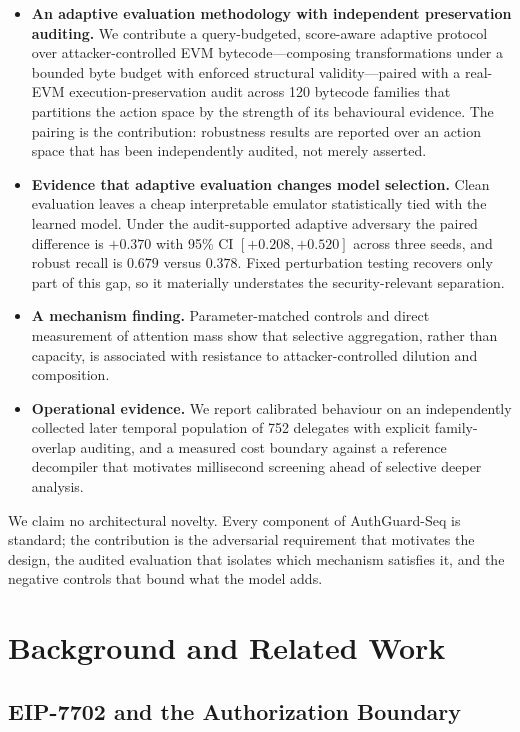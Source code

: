 \documentclass[conference]{IEEEtran}
\begin{document}
\begin{itemize}
    \item \textbf{An adaptive evaluation methodology with independent preservation auditing.} We contribute a query-budgeted, score-aware adaptive protocol over attacker-controlled EVM bytecode---composing transformations under a bounded byte budget with enforced structural validity---paired with a real-EVM execution-preservation audit across 120 bytecode families that partitions the action space by the strength of its behavioural evidence. The pairing is the contribution: robustness results are reported over an action space that has been independently audited, not merely asserted.
    \item \textbf{Evidence that adaptive evaluation changes model selection.} Clean evaluation leaves a cheap interpretable emulator statistically tied with the learned model. Under the audit-supported adaptive adversary the paired difference is $+0.370$ with 95\% CI $[+0.208,+0.520]$ across three seeds, and robust recall is $0.679$ versus $0.378$. Fixed perturbation testing recovers only part of this gap, so it materially understates the security-relevant separation.
    \item \textbf{A mechanism finding.} Parameter-matched controls and direct measurement of attention mass show that selective aggregation, rather than capacity, is associated with resistance to attacker-controlled dilution and composition.
    \item \textbf{Operational evidence.} We report calibrated behaviour on an independently collected later temporal population of 752 delegates with explicit family-overlap auditing, and a measured cost boundary against a reference decompiler that motivates millisecond screening ahead of selective deeper analysis.
\end{itemize}

We claim no architectural novelty. Every component of AuthGuard-Seq is standard; the contribution is the adversarial requirement that motivates the design, the audited evaluation that isolates which mechanism satisfies it, and the negative controls that bound what the model adds.

\section{Background and Related Work}
\label{sec:related}

\subsection{EIP-7702 and the Authorization Boundary}
\end{document}
